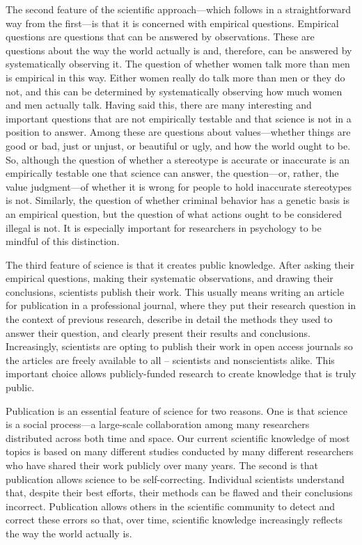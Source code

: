 The second feature of the scientific approach---which follows in a straightforward way from the first---is that it is concerned with empirical questions. Empirical questions are questions that can be answered by observations. These are questions about the way the world actually is and, therefore, can be answered by systematically observing it. The question of whether women talk more than men is empirical in this way. Either women really do talk more than men or they do not, and this can be determined by systematically observing how much women and men actually talk. Having said this, there are many interesting and important questions that are not empirically testable and that science is not in a position to answer. Among these are questions about values---whether things are good or bad, just or unjust, or beautiful or ugly, and how the world ought to be. So, although the question of whether a stereotype is accurate or inaccurate is an empirically testable one that science can answer, the question---or, rather, the value judgment---of whether it is wrong for people to hold inaccurate stereotypes is not. Similarly, the question of whether criminal behavior has a genetic basis is an empirical question, but the question of what actions ought to be considered illegal is not. It is especially important for researchers in psychology to be mindful of this distinction.

The third feature of science is that it creates public knowledge. After asking their empirical questions, making their systematic observations, and drawing their conclusions, scientists publish their work. This usually means writing an article for publication in a professional journal, where they put their research question in the context of previous research, describe in detail the methods they used to answer their question, and clearly present their results and conclusions. Increasingly, scientists are opting to publish their work in open access journals so the articles are freely available to all -- scientists and nonscientists alike. This important choice allows publicly-funded research to create knowledge that is truly public.

Publication is an essential feature of science for two reasons. One is that science is a social process---a large-scale collaboration among many researchers distributed across both time and space. Our current scientific knowledge of most topics is based on many different studies conducted by many different researchers who have shared their work publicly over many years. The second is that publication allows science to be self-correcting. Individual scientists understand that, despite their best efforts, their methods can be flawed and their conclusions incorrect. Publication allows others in the scientific community to detect and correct these errors so that, over time, scientific knowledge increasingly reflects the way the world actually is.

